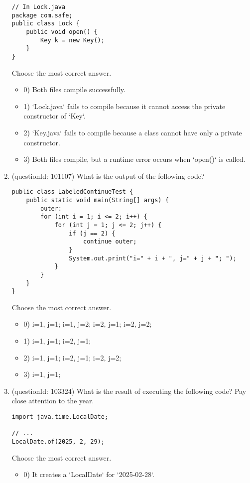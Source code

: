 \documentclass[12pt]{article}
\begin{document}
\begin{enumerate}[label=(\arabic*)]
\begin{verbatim}
// In Lock.java
package com.safe;
public class Lock {
    public void open() {
        Key k = new Key();
    }
}
\end{verbatim}
Choose the most correct answer. 
\begin{itemize}
\item 0) Both files compile successfully.

\item 1) `Lock.java` fails to compile because it cannot access the private constructor of `Key`.

\item 2) `Key.java` fails to compile because a class cannot have only a private constructor.

\item 3) Both files compile, but a runtime error occurs when `open()` is called.

\end{itemize}
\item (questionId: 101107) What is the output of the following code?\n\begin{verbatim}
public class LabeledContinueTest {
    public static void main(String[] args) {
        outer:
        for (int i = 1; i <= 2; i++) {
            for (int j = 1; j <= 2; j++) {
                if (j == 2) {
                    continue outer;
                }
                System.out.print("i=" + i + ", j=" + j + "; ");
            }
        }
    }
}
\end{verbatim}
Choose the most correct answer. 
\begin{itemize}
\item 0) i=1, j=1; i=1, j=2; i=2, j=1; i=2, j=2; 

\item 1) i=1, j=1; i=2, j=1; 

\item 2) i=1, j=1; i=2, j=1; i=2, j=2; 

\item 3) i=1, j=1; 

\end{itemize}
\item (questionId: 103324) What is the result of executing the following code? Pay close attention to the year.
\begin{verbatim}
import java.time.LocalDate;

// ...
LocalDate.of(2025, 2, 29);
\end{verbatim}
Choose the most correct answer. 
\begin{itemize}
\item 0) It creates a `LocalDate` for `2025-02-28`.


\end{itemize}
\end{enumerate}
\end{document}
